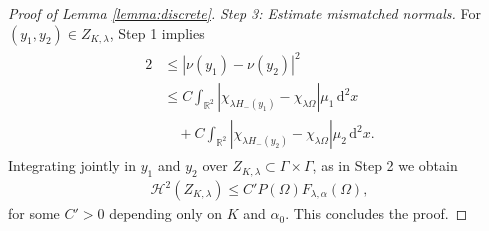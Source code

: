 \documentclass[11pt]{article}
\numberwithin{statement}{section}
\numberwithin{equation}{section}
\theoremstyle{remark}
\newcommand{\R}{\mathbb R} 				%
\newcommand{\intd}{\, \mathrm{d}} 				%
\begin{document}
\begin{proof}[Proof of Lemma \ref{lemma:discrete}]
        \textit{Step 3: Estimate mismatched normals.}  For
        $(y_1,y_2) \in Z_{K,\lambda}$, Step 1 implies
	\begin{align}
	  \begin{split}
            2& \leq |\nu(y_1) - \nu(y_2)|^2\\
            & \leq C \int_{\R^2} \left| \chi_{\lambda H_-(y_1)} -
              \chi_{\lambda \Omega} \right| \mu_1
            \intd^2 x  \\
            & \quad + C \int_{\R^2} \left| \chi_{\lambda
                H_-(y_2)} - \chi_{\lambda \Omega} \right| \mu_2
            \intd^2 x.
	  \end{split}
	\end{align}
	Integrating jointly in $y_1$ and $y_2$ over
          $Z_{K,\lambda} \subset \Gamma \times \Gamma$, as in
          Step 2 we obtain
	\begin{align}
          \mathcal{H}^2(Z_{K,\lambda})  \leq  C' P(\Omega)
          F_{\lambda,\alpha}(\Omega), 
	\end{align}
	for some $C' > 0$ depending only on $K$ and
          $\alpha_0$. This concludes the proof.
\end{proof}
\end{document}
